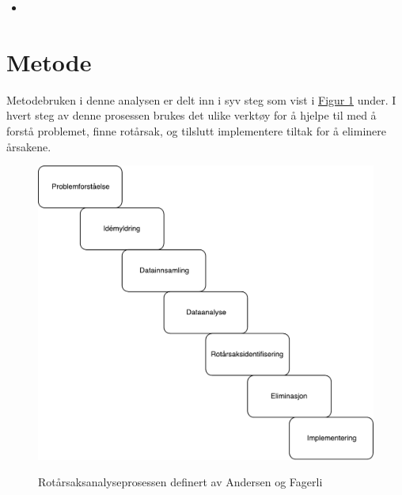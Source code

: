 \begin{itemize}
    \item 
\end{itemize}

\section{Metode}
Metodebruken i denne analysen er delt inn i syv steg som vist i \hyperref[fig:prosess]{Figur 1} under. I hvert steg av denne prosessen brukes det ulike verktøy for å hjelpe til med å forstå problemet, finne rotårsak, og tilslutt implementere tiltak for å eliminere årsakene. 
\begin{figure}[H]
    \centering
    \includegraphics[scale=0.6]{case_1/bilder/prosess.pdf}
    \label{fig:prosess}
    \caption[Rotårsaksanalyseprosessen]{Rotårsaksanalyseprosessen definert av Andersen og Fagerli}
\end{figure}